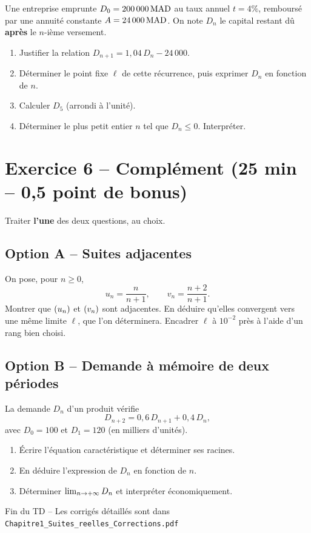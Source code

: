 \documentclass[11pt,a4paper]{article}
\begin{document}
Une entreprise emprunte $D_0 = 200\,000\,\mathrm{MAD}$ au taux annuel $t=4\%$, remboursé par une annuité constante $A=24\,000\,\mathrm{MAD}$. On note $D_n$ le capital restant dû \textbf{après} le $n$-ième versement.

\begin{enumerate}
  \item Justifier la relation $D_{n+1} = 1{,}04\, D_n - 24\,000$.
  \item Déterminer le point fixe $\ell$ de cette récurrence, puis exprimer $D_n$ en fonction de $n$.
  \item Calculer $D_5$ (arrondi à l'unité).
  \item Déterminer le plus petit entier $n$ tel que $D_n \leq 0$. Interpréter.
\end{enumerate}

\section*{Exercice 6 -- Complément \hfill {\normalsize\normalfont (25 min -- 0,5 point de bonus)}}

Traiter \textbf{l'une} des deux questions, au choix.

\subsection*{Option A -- Suites adjacentes}

On pose, pour $n\geq 0$,
\[
u_n = \dfrac{n}{n+1}, \qquad v_n = \dfrac{n+2}{n+1}.
\]
Montrer que $(u_n)$ et $(v_n)$ sont adjacentes. En déduire qu'elles convergent vers une même limite $\ell$, que l'on déterminera. Encadrer $\ell$ à $10^{-2}$ près à l'aide d'un rang bien choisi.

\subsection*{Option B -- Demande à mémoire de deux périodes}

La demande $D_n$ d'un produit vérifie
\[
D_{n+2} = 0{,}6\, D_{n+1} + 0{,}4\, D_n,
\]
avec $D_0 = 100$ et $D_1 = 120$ (en milliers d'unités).
\begin{enumerate}
  \item Écrire l'équation caractéristique et déterminer ses racines.
  \item En déduire l'expression de $D_n$ en fonction de $n$.
  \item Déterminer $\lim_{n\to +\infty} D_n$ et interpréter économiquement.
\end{enumerate}

\vspace{0.6cm}
\begin{center}
{\small\color{mundigray} Fin du TD -- Les corrigés détaillés sont dans \texttt{Chapitre1\_Suites\_reelles\_Corrections.pdf}}
\end{center}
\end{document}
